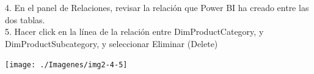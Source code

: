      
\begin{itemize}
   4.   En el panel de Relaciones, revisar la relación que Power BI ha creado entre las dos tablas.\\
   5.   Hacer click en la línea de la relación entre DimProductCategory, y DimProductSubcategory, y seleccionar Eliminar (Delete)\\
   
\end{itemize} 

    
\begin{center}
\texttt{[image: ./Imagenes/img2-4-5]} 
\end{center}
    
    
    
    
    